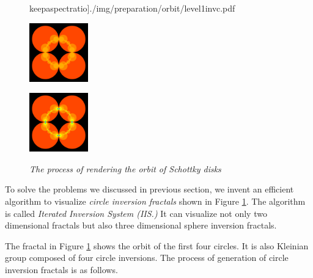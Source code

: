\begin{figure}[htbp]
\begin{minipage}[t]{0.16\hsize}
  keepaspectratio]{./img/preparation/orbit/level1invc.pdf}
  \subcaption{}
  \label{fig:level1inv}
 \end{minipage}
 \begin{minipage}[t]{0.16\hsize}
  \center
  \includegraphics[width=1in, height=1in, keepaspectratio]{./img/preparation/orbit/level2c.pdf}
  \subcaption{}
  \label{fig:level2}
 \end{minipage}
 \begin{minipage}[t]{0.16\hsize}
  \center
  \includegraphics[width=1in, height=1in, keepaspectratio]{img/preparation/orbit/levelMaxc.pdf}
  \subcaption{}
  \label{fig:levelMax}
 \end{minipage}
 \caption{\textit{The process of rendering the orbit of Schottky disks}}
\end{figure}

To solve the problems we discussed in previous section,
we invent an efficient algorithm to visualize \textit{circle inversion
fractals} shown in Figure \ref{fig:levelMax}. 
The algorithm is called \textit{Iterated Inversion System (IIS.)}
It can visualize not only two dimensional fractals but
also three dimensional sphere inversion fractals.

The fractal in Figure \ref{fig:levelMax} shows the orbit of the first
four circles.
It is also Kleinian group composed of four circle inversions.
The process of generation of circle inversion fractals is
as follows.

